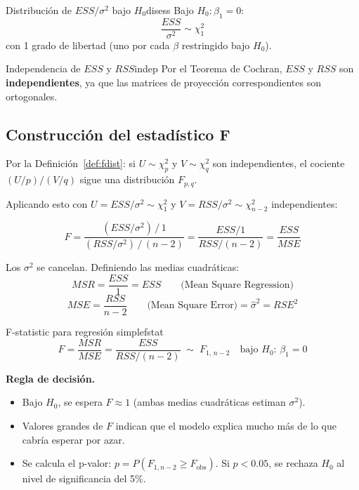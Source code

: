 \documentclass[12pt, a4paper]{article}
\begin{document}
\begin{proposicion}{Distribución de $ESS/\sigma^2$ bajo $H_0$}{disess}
Bajo $H_0: \beta_1 = 0$:
\[
  \frac{ESS}{\sigma^2} \sim \chi^2_1
\]
con 1 grado de libertad (uno por cada $\beta$ restringido bajo $H_0$).
\end{proposicion}

\begin{proposicion}{Independencia de $ESS$ y $RSS$}{indep}
Por el Teorema de Cochran, $ESS$ y $RSS$ son \textbf{independientes}, ya
que las matrices de proyección correspondientes son ortogonales.
\end{proposicion}

\subsection{Construcción del estadístico F}

Por la Definición~\ref{def:fdist}: si $U \sim \chi^2_p$ y $V \sim \chi^2_q$
son independientes, el cociente $(U/p)/(V/q)$ sigue una distribución $F_{p,q}$.

Aplicando esto con $U = ESS/\sigma^2 \sim \chi^2_1$ y
$V = RSS/\sigma^2 \sim \chi^2_{n-2}$ independientes:

\[
  F
    = \frac{(ESS/\sigma^2)\,/\,1}{(RSS/\sigma^2)\,/\,(n-2)}
    = \frac{ESS/1}{RSS/(n-2)}
    = \frac{ESS}{MSE}
\]

Los $\sigma^2$ se cancelan. Definiendo las medias cuadráticas:
\[
  MSR = \frac{ESS}{1} = ESS
  \qquad \text{(Mean Square Regression)}
\]
\[
  MSE = \frac{RSS}{n-2}
  \qquad \text{(Mean Square Error)} = \hat{\sigma}^2 = RSE^2
\]

\begin{resultado}{F-statistic para regresión simple}{fstat}
\[
  \boxed{
    F = \frac{MSR}{MSE}
      = \frac{ESS}{RSS/(n-2)}
      \;\sim\; F_{1,\,n-2}
      \quad \text{bajo } H_0:\,\beta_1=0
  }
\]
\end{resultado}

\begin{notabox}
\textbf{Regla de decisión.}
\begin{itemize}[nosep]
  \item Bajo $H_0$, se espera $F \approx 1$ (ambas medias cuadráticas
        estiman $\sigma^2$).
  \item Valores grandes de $F$ indican que el modelo explica mucho más de lo
        que cabría esperar por azar.
  \item Se calcula el p-valor: $p = P(F_{1,n-2} \geq F_{\text{obs}})$. Si
        $p < 0.05$, se rechaza $H_0$ al nivel de significancia del 5\%.
\end{itemize}
\end{notabox}
\end{document}

